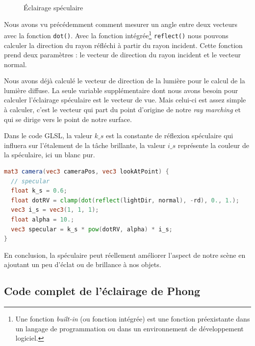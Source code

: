 \begin{figure}[h]
\begin{minipage}[b]{0.45\linewidth}
    \caption{Éclairage spéculaire}
    \label{specular01}
  \end{minipage}
\end{figure}

Nous avons vu précédemment comment mesurer un angle entre deux vecteurs avec la fonction \lstinline{dot()}. Avec la fonction intégrée\footnote{Une fonction \textit{built-in} (ou fonction intégrée) est une fonction préexistante dans un langage de programmation ou dans un environnement de développement logiciel.} \lstinline{reflect()} nous pouvons calculer la direction du rayon réfléchi à partir du rayon incident. Cette fonction prend deux paramètres : le vecteur de direction du rayon incident et le vecteur normal.

Nous avons déjà calculé le vecteur de direction de la lumière pour le calcul de la lumière diffuse. La seule variable supplémentaire dont nous avons besoin pour calculer l'éclairage spéculaire est le vecteur de vue. Mais celui-ci est assez simple à calculer, c'est le vecteur qui part du point d'origine de notre \textit{ray marching} et qui se dirige vers le point de notre surface.

Dans le code GLSL, la valeur $k\_s$ est la constante de réflexion spéculaire qui influera sur l'étalement de la tâche brillante, la valeur $i\_s$ représente la couleur de la spéculaire, ici un blanc pur.

\begin{minipage}{\linewidth}
\begin{lstlisting}[language=GLSL, caption=Spéculaire,captionpos=b,frame=single]
mat3 camera(vec3 cameraPos, vec3 lookAtPoint) {
  // specular
  float k_s = 0.6;
  float dotRV = clamp(dot(reflect(lightDir, normal), -rd), 0., 1.);
  vec3 i_s = vec3(1, 1, 1);
  float alpha = 10.;
  vec3 specular = k_s * pow(dotRV, alpha) * i_s;
}
\end{lstlisting}
\end{minipage}

En conclusion, la spéculaire peut réellement améliorer l'aspect de notre scène en ajoutant un peu d'éclat ou de brillance à nos objets.

\subsection*{Code complet de l'éclairage de Phong}

